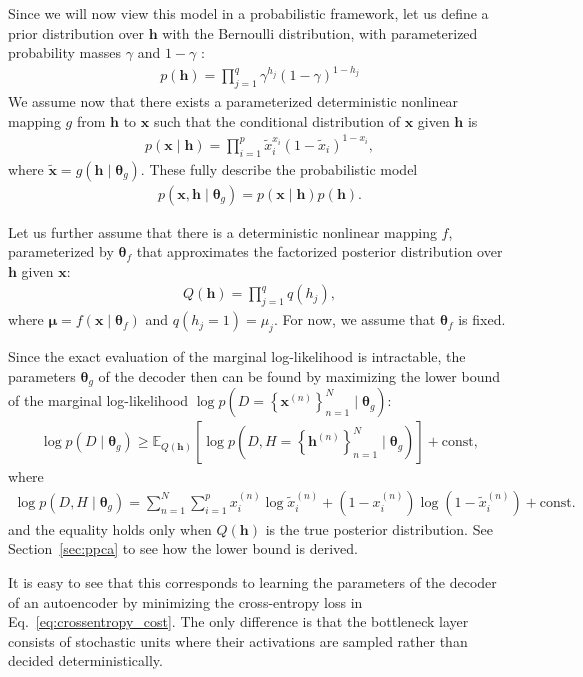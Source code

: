 \documentclass[dissertation,nocontribution,draft*]{aaltoseries}
\newcommand{\vect}[1]{\mathbf{#1}}
\newcommand{\vects}[1]{\boldsymbol{#1}}
\newcommand{\vh}[0]{\vect{h}}
\newcommand{\vx}[0]{\vect{x}}
\newcommand{\vmu}[0]{\vects{\mu}}
\newcommand{\TT}[0]{{\vects{\theta}}}
\newcommand{\E}[0]{\mathbb{E}}
\begin{document}
Since we will now view this model in a probabilistic
framework, let us define a prior distribution over $\vh$
with the
Bernoulli distribution, with parameterized probability masses
$\gamma$ and $1-\gamma$ :
\begin{align}
    \label{eq:ae_prior}
    p(\vh) = \prod_{j=1}^q \gamma^{h_j} (1 - \gamma)^{1 -
    h_j}
\end{align}
We assume now that there exists a parameterized
deterministic nonlinear mapping $g$ from $\vh$ to $\vx$ such
that the conditional distribution of $\vx$ given $\vh$ is
\begin{align}
    \label{eq:ae_cond}
    p(\vx \mid \vh) = \prod_{i=1}^p \tilde{x}_i^{x_i} (1 -
    \tilde{x}_i)^{1 - x_i},
\end{align}
where $\tilde{\vx} = g(\vh \mid \TT_g)$. These fully
describe the probabilistic model 
\begin{align}
    \label{eq:ae_full}
p(\vx, \vh \mid \TT_g) = p(\vx \mid \vh) p(\vh).
\end{align}

Let us further assume that there is a deterministic
nonlinear mapping $f$, parameterized by $\TT_f$ that
approximates the factorized posterior distribution over
$\vh$ given $\vx$:
\begin{align}
    \label{eq:ae_posterior}
    Q(\vh) = \prod_{j=1}^q q(h_j),
\end{align}
where $\vmu = f(\vx \mid \TT_f)$ and $q(h_j = 1) = \mu_j$.
For now, we assume that $\TT_f$ is fixed.

Since the exact evaluation of the marginal log-likelihood is
intractable, the parameters $\TT_g$ of the decoder then
can be found by maximizing the lower bound of the marginal
log-likelihood $\log p(D = \left\{ \vx^{(n)}
\right\}_{n=1}^N \mid \TT_g)$:
\begin{align*}
    \log p(D \mid \TT_g) \geq \E_{Q(\vh)} \left[ \log p\left(D,
    H=\left\{ \vh^{(n)} \right\}_{n=1}^N \mid \TT_g\right) \right] +
    \text{const},
\end{align*}
where 
\begin{align*}
    \log p(D, H \mid \TT_g) = \sum_{n=1}^N \sum_{i=1}^p
    x^{(n)}_i \log
    \tilde{x}^{(n)}_i + (1 - x^{(n)}_i) \log (1 -
    \tilde{x}^{(n)}_i) + \text{const}.
\end{align*}
and the equality holds only when $Q(\vh)$ is the true
posterior distribution. See Section~\ref{sec:ppca} to see
how the lower bound is derived.

It is easy to see that this corresponds to learning the
parameters of the decoder of an autoencoder by minimizing
the cross-entropy loss in Eq.~\eqref{eq:crossentropy_cost}.
The only difference is that the bottleneck layer consists of
stochastic units where their activations are sampled
rather than decided deterministically. 
\end{document}
